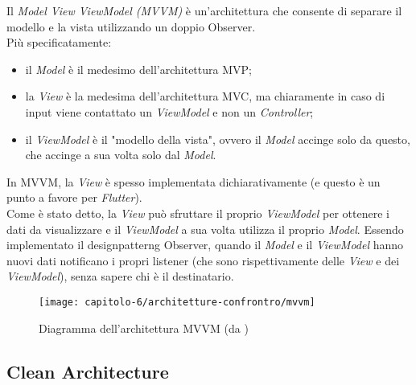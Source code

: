 Il \emph{Model View ViewModel (MVVM)} è un'architettura che consente di separare il modello e la vista utilizzando un doppio Observer.\\
Più specificatamente:
\begin{itemize}
    \item il \emph{Model} è il medesimo dell'architettura MVP;
    \item la \emph{View} è la medesima dell'architettura MVC, ma chiaramente in caso di input viene contattato un \emph{ViewModel} e non un \emph{Controller};
    \item il \emph{ViewModel} è il "modello della vista", ovvero il \emph{Model} accinge solo da questo, che accinge a sua volta solo dal \emph{Model}.
\end{itemize}
In MVVM, la \emph{View} è spesso implementata dichiarativamente (e questo è un punto a favore per \emph{Flutter}).\\
Come è stato detto, la \emph{View} può sfruttare il proprio \emph{ViewModel} per ottenere i dati da visualizzare e il \emph{ViewModel} a sua volta utilizza il proprio \emph{Model}.
Essendo implementato il \gls{designpatterng} Observer, quando il \emph{Model} e il \emph{ViewModel} hanno nuovi dati notificano i propri listener (che sono rispettivamente delle \emph{View} e dei \emph{ViewModel}), senza sapere chi è il destinatario.\\

\begin{figure}[!h]
    \centering 
    \texttt{[image: capitolo-6/architetture-confrontro/mvvm]} 
    \caption{Diagramma dell'architettura MVVM (da \cite{site:mvvm})}
\end{figure}

\subsection{Clean Architecture}
\label{subsec:clean-architecture}

